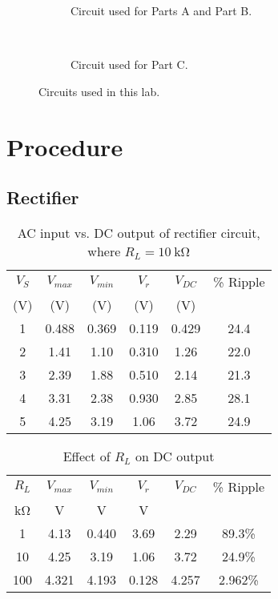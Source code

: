 \documentclass{article}
\begin{document}
\begin{figure}[hbtp]
  \centering
  \begin{subfigure}[b]{0.4\textwidth}
    \caption{\label{fig:circuit1} Circuit used for Parts A and Part B.}
  \end{subfigure}%
  ~
  \begin{subfigure}[b]{0.6\textwidth}
    \caption{\label{fig:circuit2} Circuit used for Part C.}
  \end{subfigure}
  \caption{\label{fig:circuits_tested} Circuits used in this lab.}
\end{figure}

\section{Procedure}
\label{sec:procedure}

\subsection{Rectifier}
\label{sec:rectifier}

\begin{table}[hbtp]
  \centering
  \begin{tabular}{cccccc}
    $V_S$ & $V_{max}$ & $V_{min}$ & $V_r$ & $V_{DC}$ & \% Ripple \\
    (V) & (V) & (V) & (V) & (V) &\\
    \hline
    1 & 0.488 & 0.369 & 0.119 & 0.429 & 24.4 \\
    2 & 1.41 & 1.10 & 0.310 & 1.26 & 22.0 \\
    3 & 2.39 & 1.88 & 0.510 & 2.14 & 21.3 \\
    4 & 3.31 & 2.38 & 0.930 & 2.85 & 28.1 \\
    5 & 4.25 & 3.19 & 1.06 & 3.72 & 24.9 \\
  \end{tabular}
  \caption{\label{tab:rect_vp_vdc} AC input vs. DC output of rectifier circuit, where $R_L=\SI{10}{\kilo\ohm}$}
\end{table}

\begin{table}[hbtp]
\centering
\begin{tabular}{cccccc}
$R_L$ & $V_{max}$ & $V_{min}$ & $V_r$ & $V_{DC}$ & \% {Ripple} \\
\si{\kilo\ohm} & \si{V} & \si{V} & \si{V} & & \\
\hline
1 & 4.13 & 0.440 & 3.69 & 2.29 & 89.3\% \\
10 & 4.25 & 3.19 & 1.06 & 3.72 & 24.9\% \\
100 & 4.321 & 4.193 & 0.128 & 4.257 & 2.962\% \\
\end{tabular}
\caption{\label{tab:load_v_ripple} Effect of $R_L$ on DC output}
\end{table}
\end{document}
